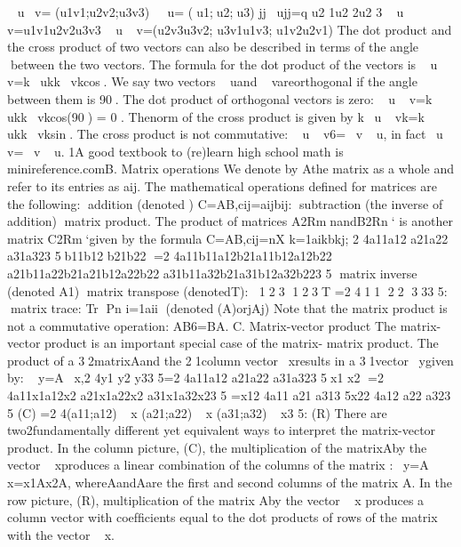 ~ u ~ v= \left(u1 v1;u2 v2;u3 v3\right)
~ u= \left(u1;u2;u3\right)
jj~ ujj=q
u2
1\+u2
2\+u2
3
~ u~ v=u1v1\+u2v2\+u3v3
~ u~ v=\left(u2v3 u3v2; u3v1 u1v3; u1v2 u2v1\right)
The dot product and the cross product of two vectors can also be described
in terms of the angle between the two vectors. The formula for the dot
product of the vectors is ~ u~ v=k~ ukk~ vkcos. We say two vectors ~ uand
~ vareorthogonal if the angle between them is 90. The dot product of
orthogonal vectors is zero: ~ u~ v=k~ ukk~ vkcos\left(90\right) = 0 .
Thenorm of the cross product is given by k~ u~ vk=k~ ukk~ vksin. The
cross product is not commutative: ~ u~ v6=~ v~ u, in fact~ u~ v= ~ v~ u.
1A good textbook to \left(re\right)learn high school math is minireference.comB. Matrix operations
We denote by Athe matrix as a whole and refer to its entries as aij.
The mathematical operations deﬁned for matrices are the following:
addition \left(denoted \+\right)
C=A\+B,cij=aij\+bij:
subtraction \left(the inverse of addition\right)
matrix product. The product of matrices A2RmnandB2Rn`
is another matrix C2Rm`given by the formula
C=AB,cij=nX
k=1aikbkj;
2
4a11a12
a21a22
a31a323
5b11b12
b21b22
=2
4a11b11\+a12b21a11b12\+a12b22
a21b11\+a22b21a21b12\+a22b22
a31b11\+a32b21a31b12\+a32b223
5
matrix inverse \left(denoted A 1\right)
matrix transpose \left(denotedT\right):
123
123T
=2
411
22
333
5:
matrix trace: Tr \left[A\right]Pn
i=1aii
\determinant \left(denoted \det \left(A\right)orjAj\right)
Note that the matrix product is not a commutative operation: AB6=BA.
C. Matrix-vector product
The matrix-vector product is an important special case of the matrix-
matrix product. The product of a 32matrixAand the 21column
vector~ xresults in a 31vector~ ygiven by:
~ y=A~ x,2
4y1
y2
y33
5=2
4a11a12
a21a22
a31a323
5x1
x2
=2
4a11x1\+a12x2
a21x1\+a22x2
a31x1\+a32x23
5
=x12
4a11
a21
a313
5\+x22
4a12
a22
a323
5 \left(C\right)
=2
4\left(a11;a12\right)~ x
\left(a21;a22\right)~ x
\left(a31;a32\right)~ x3
5: \left(R\right)
There are two2fundamentally different yet equivalent ways to interpret the
matrix-vector product. In the column picture, \left(C\right), the multiplication of the
matrixAby the vector ~ xproduces a linear combination of the columns
of the matrix :~ y=A~ x=x1A\left[:;1\right]\+x2A\left[:;2\right], whereA\left[:;1\right]andA\left[:;2\right]are
the ﬁrst and second columns of the matrix A.
In the row picture, \left(R\right), multiplication of the matrix Aby the vector ~ x
produces a column vector with coefﬁcients equal to the dot products of
rows of the matrix with the vector ~ x.
